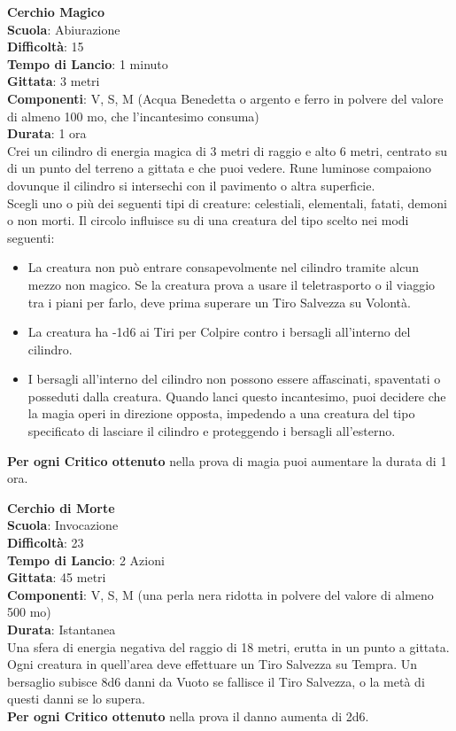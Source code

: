 \begin{multicols}{2}
\medskip\textbf{Cerchio Magico}\\
\textbf{Scuola}: Abiurazione\\
\textbf{Difficoltà}: 15\\
\textbf{Tempo di Lancio}: 1 minuto\\
\textbf{Gittata}: 3 metri\\
\textbf{Componenti}: V, S, M (Acqua Benedetta o argento e ferro in polvere del valore di almeno 100 mo, che l'incantesimo consuma)\\
\textbf{Durata}: 1 ora\\
Crei un cilindro di energia magica di 3 metri di raggio e alto 6 metri, centrato su di un punto del terreno a gittata e che puoi vedere. Rune luminose compaiono dovunque il cilindro si intersechi con il pavimento o altra superficie.\\
Scegli uno o più dei seguenti tipi di creature: celestiali, elementali, fatati, demoni o non morti. Il circolo influisce su di una creatura del tipo scelto nei modi seguenti:\\
\begin{itemize}
	\item 
La creatura non può entrare consapevolmente nel cilindro tramite alcun mezzo non magico. Se la creatura prova a usare il teletrasporto o il viaggio tra i piani per farlo, deve prima superare un Tiro Salvezza su Volontà.
	\item 
La creatura ha -1d6 ai Tiri per Colpire contro i bersagli all'interno del cilindro.
	\item 
I bersagli all'interno del cilindro non possono essere affascinati, spaventati o posseduti dalla creatura. Quando lanci questo incantesimo, puoi decidere che la magia operi in direzione opposta, impedendo a una creatura del tipo specificato di lasciare il cilindro e proteggendo i bersagli all'esterno.
\end{itemize}
\textbf{Per ogni Critico ottenuto} nella prova di magia puoi aumentare la durata di 1 ora.

\medskip\textbf{Cerchio di Morte}\\
\textbf{Scuola}: Invocazione\\
\textbf{Difficoltà}: 23\\
\textbf{Tempo di Lancio}: 2 Azioni\\
\textbf{Gittata}: 45 metri\\
\textbf{Componenti}: V, S, M (una perla nera ridotta in polvere del valore di almeno 500 mo)\\
\textbf{Durata}: Istantanea\\
Una sfera di energia negativa del raggio di 18 metri, erutta in un punto a gittata. Ogni creatura in quell'area deve effettuare un Tiro Salvezza su Tempra. Un bersaglio subisce 8d6 danni da Vuoto se fallisce il Tiro Salvezza, o la metà di questi danni se lo supera. \\
\textbf{Per ogni Critico ottenuto} nella prova il danno aumenta di 2d6.


\end{multicols}
